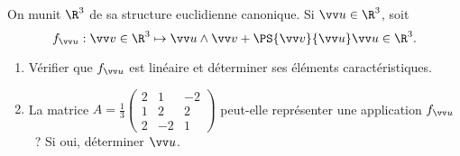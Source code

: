\begin{enonce}
\begin{exercise}[ID={RMS123 E614 Mines PSI},subtitle={},tags={}]
On munit $\R^3$ de sa structure euclidienne canonique.
Si $\vv u\in\R^3$, soit
\begin{equation*}
  f_{\vv u} : \vv v\in\R^3 \mapsto \vv u\wedge \vv v+ \PS{\vv v}{\vv u} \vv u\in\R^3.
\end{equation*}
\begin{enumerate}
  \item Vérifier que $f_{\vv u}$ est linéaire et déterminer ses éléments caractéristiques.
  \item La matrice
    \begin{math}
      A=
      \frac13
      \begin{pmatrix}
      2&1&-2\\
      1&2&2\\
      2&-2&1
      \end{pmatrix}
    \end{math}
    peut-elle représenter une application $f_{\vv u}$~?
    Si oui, déterminer $\vv u$.
\end{enumerate}
\end{exercise}
\begin{solution}
\end{solution}
\end{enonce}
